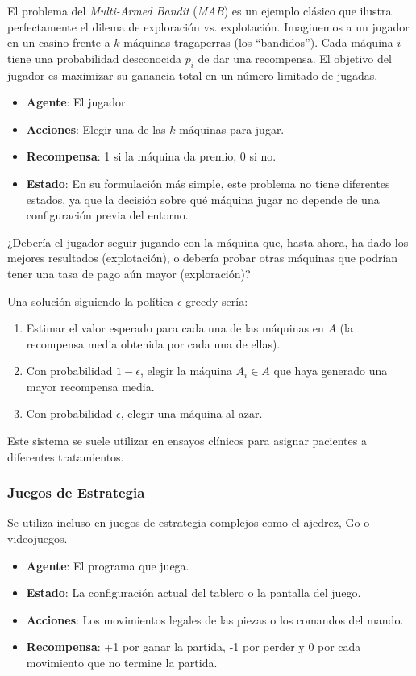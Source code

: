\documentclass[12pt,a4paper]{book}
\begin{document}
El problema del \textit{Multi-Armed Bandit} (\textit{MAB}) \citep{MAB} es un ejemplo clásico que ilustra perfectamente el dilema de exploración vs. explotación. Imaginemos a un jugador en un casino frente a $k$ máquinas tragaperras (los ``bandidos'').
Cada máquina $i$ tiene una probabilidad desconocida $p_i$ de dar una recompensa. El objetivo del jugador es maximizar su ganancia total en un número limitado de jugadas.

\begin{itemize}
    \item \textbf{Agente}: El jugador.
    \item \textbf{Acciones}: Elegir una de las $k$ máquinas para jugar.
    \item \textbf{Recompensa}: 1 si la máquina da premio, 0 si no.
    \item \textbf{Estado}: En su formulación más simple, este problema no tiene diferentes estados, ya que la decisión sobre qué máquina jugar no depende de una configuración previa del entorno.
\end{itemize}

¿Debería el jugador seguir jugando con la máquina que, hasta ahora, ha dado los mejores resultados (explotación), o debería probar otras máquinas que podrían tener una tasa de pago aún mayor (exploración)?

Una solución siguiendo la política $\epsilon$-greedy sería:
\begin{enumerate}
    \item Estimar el valor esperado para cada una de las máquinas en $A$ (la recompensa media obtenida por cada una de ellas).
    \item Con probabilidad $1-\epsilon$, elegir la máquina $A_i \in A$ que haya generado una mayor recompensa media.
    \item Con probabilidad $\epsilon$, elegir una máquina al azar.
\end{enumerate}

Este sistema se suele utilizar en ensayos clínicos para asignar pacientes a diferentes tratamientos.

\subsubsection{Juegos de Estrategia}

Se utiliza incluso en juegos de estrategia complejos como el ajedrez, Go o videojuegos.

\begin{itemize}
    \item \textbf{Agente}: El programa que juega.
    \item \textbf{Estado}: La configuración actual del tablero o la pantalla del juego.
    \item \textbf{Acciones}: Los movimientos legales de las piezas o los comandos del mando.
    \item \textbf{Recompensa}: +1 por ganar la partida, -1 por perder y 0 por cada movimiento que no termine la partida.
\end{itemize}
\end{document}
